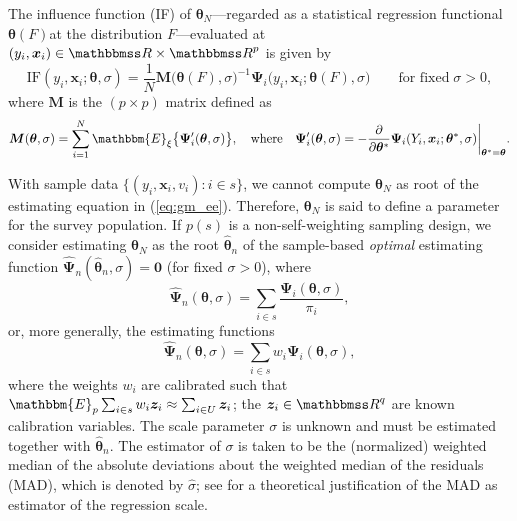 \documentclass[a4paper,oneside,11pt,DIV=12]{scrartcl}
\newcommand{\R}{{\mathbbmss R}}         %
\theoremstyle{remark}
\begin{document}
The influence function (IF) of $\bm \theta_{N}$---regarded as a statistical regression functional $\bm \theta (F)$at the distribution $F$---evaluated at $(y_i,\bm x_i) \in \R \times \R^p$ is given by \citep[][Chap. 6.3]{hampel_ronchetti_etal_1986}
\begin{equation}\label{eq:gm_if}
    \mathrm{IF}(y_i, \bm x_i; \bm \theta, \sigma) = \frac{1}{N}\bm M\big(\bm \theta(F),\sigma \big)^{-1} \bm \Psi_i \big(y_i, \bm x_i;\bm \theta (F), \sigma \big) \qquad \text{for fixed} \; \sigma > 0,
\end{equation}
where $\bm M$ is the $(p \times p)$ matrix defined as
\begin{equation}\label{eq:gm_if_m}
    \bm M(\bm \theta, \sigma) = \sum_{i=1}^N \mathbbm{E}_{\xi} \big\{ \bm \Psi_i'(\bm \theta, \sigma) \big\}, \quad \text{where} \quad
    \bm \Psi_i'(\bm \theta, \sigma) = -\frac{\partial}{\partial \bm \theta^*} \bm \Psi_i(Y_i, \bm x_i; \bm \theta^*, \sigma) \bigg\vert_{\bm \theta^* = \bm \theta}.
\end{equation}

With sample data $\{(y_i, \bm x_i, v_i) : i \in s\}$, we cannot compute $\bm \theta_{N}$ as root of the estimating equation in (\ref{eq:gm_ee}). Therefore, $\bm \theta_{N}$ is said to define \citep[or induce,][]{godambe_1995} a parameter for the survey population. If $p(s)$ is a non-self-weighting sampling design, we consider estimating $\bm \theta_{N}$ as the root $\widehat{\bm \theta}_n$ of the sample-based \textit{optimal} estimating function \citep[in the sense of][]{godambe_thompson_1986} $\widehat{\bm \Psi}_n(\widehat{\bm \theta}_n, \sigma) = \bm 0$ (for fixed $\sigma > 0$), where
\begin{equation}\label{eq:gm_optimal}
    \widehat{\bm \Psi}_n(\bm \theta, \sigma) = \sum_{i \in s} \frac{\bm \Psi_i(\bm \theta, \sigma)}{\pi_i},
\end{equation}
\noindent or, more generally, the estimating functions
\begin{equation}\label{eq:gm_optimal}
    \widehat{\bm \Psi}_n(\bm \theta, \sigma) = \sum_{i \in s} w_i \bm \Psi_i(\bm \theta, \sigma),
\end{equation}
\noindent where the weights $w_i$ are calibrated such that $\mathbbm{E}_p \sum_{i \in s} w_i \bm z_i \approx \sum_{i \in U} \bm z_i$; the $\bm z_i \in \R^q$ are known calibration variables. The scale parameter $\sigma$ is unknown and must be estimated together with $\widehat{\bm \theta}_{n}$. The estimator of $\sigma$ is taken to be the (normalized) weighted median of the absolute deviations about the weighted median of the residuals (MAD), which is denoted by $\widehat{\sigma}$; see \citet{welsh_1986} for a theoretical justification of the MAD as estimator of the regression scale.
\end{document}
